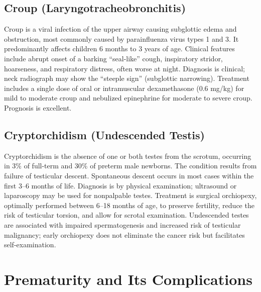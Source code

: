 \subsection{Croup (Laryngotracheobronchitis)}
\label{sec:Croup}
Croup is a viral infection of the upper airway causing subglottic edema and obstruction, most commonly caused by parainfluenza virus types 1 and 3. It predominantly affects children 6 months to 3 years of age. Clinical features include abrupt onset of a barking ``seal-like'' cough, inspiratory stridor, hoarseness, and respiratory distress, often worse at night. Diagnosis is clinical; neck radiograph may show the ``steeple sign'' (subglottic narrowing). Treatment includes a single dose of oral or intramuscular dexamethasone (0.6 mg/kg) for mild to moderate croup and nebulized epinephrine for moderate to severe croup. Prognosis is excellent.

\subsection{Cryptorchidism (Undescended Testis)}
\label{sec:Cryptorchidism}
Cryptorchidism is the absence of one or both testes from the scrotum, occurring in 3\% of full-term and 30\% of preterm male newborns. The condition results from failure of testicular descent. Spontaneous descent occurs in most cases within the first 3--6 months of life. Diagnosis is by physical examination; ultrasound or laparoscopy may be used for nonpalpable testes. Treatment is surgical orchiopexy, optimally performed between 6--18 months of age, to preserve fertility, reduce the risk of testicular torsion, and allow for scrotal examination. Undescended testes are associated with impaired spermatogenesis and increased risk of testicular malignancy; early orchiopexy does not eliminate the cancer risk but facilitates self-examination.

\section{Prematurity and Its Complications}



